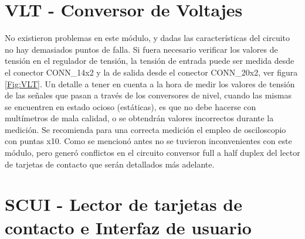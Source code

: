 \section{VLT - Conversor de Voltajes}
No existieron problemas en este módulo, y dadas las características del circuito
no hay demasiados puntos de falla. Si fuera necesario verificar los valores de
tensión en el regulador de tensión, la tensión de entrada puede ser medida desde
el conector CONN\_14x2 y la de salida desde el conector CONN\_20x2, ver figura \ref{Fig:VLT}.
Un detalle a tener en cuenta a la hora de medir los valores de tensión de las
señales que pasan a través de los conversores de nivel, cuando las mismas se 
encuentren en estado ocioso (estáticas), es que no debe hacerse con multímetros 
de mala calidad, o se obtendrán valores incorrectos durante la medición. Se 
recomienda para una correcta medición el empleo de osciloscopio con puntas x10. 
Como se mencionó antes no se tuvieron inconvenientes con este módulo, pero generó 
conflictos en el circuito conversor full a half duplex del lector de tarjetas de 
contacto que serán detallados más adelante.


\section{SCUI - Lector de tarjetas de contacto e Interfaz de usuario}


